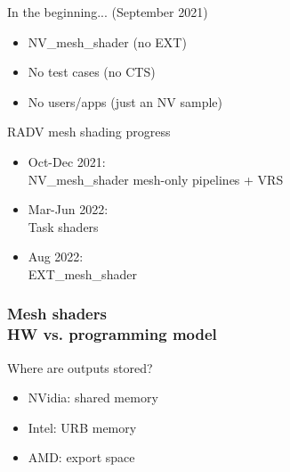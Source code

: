 \documentclass[aspectratio=169,t,xcolor=table]{beamer}
\begin{document}
\begin{frame}{In the beginning... (September 2021)}

    \LARGE

    \begin{itemize}
      	\item NV\_mesh\_shader (no EXT)
      	\item No test cases (no CTS)
      	\item No users/apps (just an NV sample)
    \end{itemize}

\end{frame}

\begin{frame}{RADV mesh shading progress}

    \LARGE

    \begin{itemize}
      	\item Oct-Dec 2021: \\ NV\_mesh\_shader mesh-only pipelines + VRS
      	\item Mar-Jun 2022: \\ Task shaders
      	\item Aug 2022: \\ EXT\_mesh\_shader
    \end{itemize}

\end{frame}

\begin{frame}{}
    \frametitle{Mesh shaders \\ HW vs. programming model}
\end{frame}

\begin{frame}{Where are outputs stored?}

    \LARGE

    \begin{itemize}
      	\item NVidia: shared memory
      	\item Intel: URB memory
      	\item AMD: export space
    \end{itemize}

\end{frame}
\end{document}
